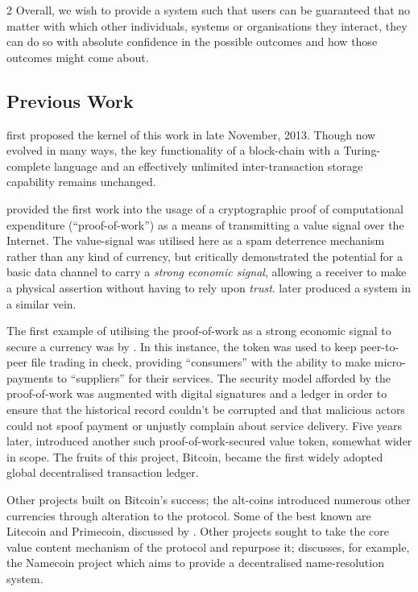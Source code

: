 \documentclass[9pt,oneside]{amsart}
\begin{document}
\begin{multicols}{2}
Overall, we wish to provide a system such that users can be guaranteed that no matter with which other individuals, systems or organisations they interact, they can do so with absolute confidence in the possible outcomes and how those outcomes might come about.

\subsection{Previous Work} \label{ch:previous}

\cite{buterin2013sila} first proposed the kernel of this work in late November, 2013. Though now evolved in many ways, the key functionality of a block-chain with a Turing-complete language and an effectively unlimited inter-transaction storage capability remains unchanged.

\cite{dwork92pricingvia} provided the first work into the usage of a cryptographic proof of computational expenditure (``proof-of-work'') as a means of transmitting a value signal over the Internet. The value-signal was utilised here as a spam deterrence mechanism rather than any kind of currency, but critically demonstrated the potential for a basic data channel to carry a \textit{strong economic signal}, allowing a receiver to make a physical assertion without having to rely upon \textit{trust}. \cite{back2002hashcash} later produced a system in a similar vein.

The first example of utilising the proof-of-work as a strong economic signal to secure a currency was by \cite{vishnumurthy03karma:a}. In this instance, the token was used to keep peer-to-peer file trading in check, providing ``consumers'' with the ability to make micro-payments to ``suppliers'' for their services. The security model afforded by the proof-of-work was augmented with digital signatures and a ledger in order to ensure that the historical record couldn't be corrupted and that malicious actors could not spoof payment or unjustly complain about service delivery. Five years later, \cite{nakamoto2008bitcoin} introduced another such proof-of-work-secured value token, somewhat wider in scope. The fruits of this project, Bitcoin, became the first widely adopted global decentralised transaction ledger.

Other projects built on Bitcoin's success; the alt-coins introduced numerous other currencies through alteration to the protocol. Some of the best known are Litecoin and Primecoin, discussed by \cite{sprankel2013technical}. Other projects sought to take the core value content mechanism of the protocol and repurpose it; \cite{aron2012bitcoin} discusses, for example, the Namecoin project which aims to provide a decentralised name-resolution system.


\end{multicols}
\end{document}
